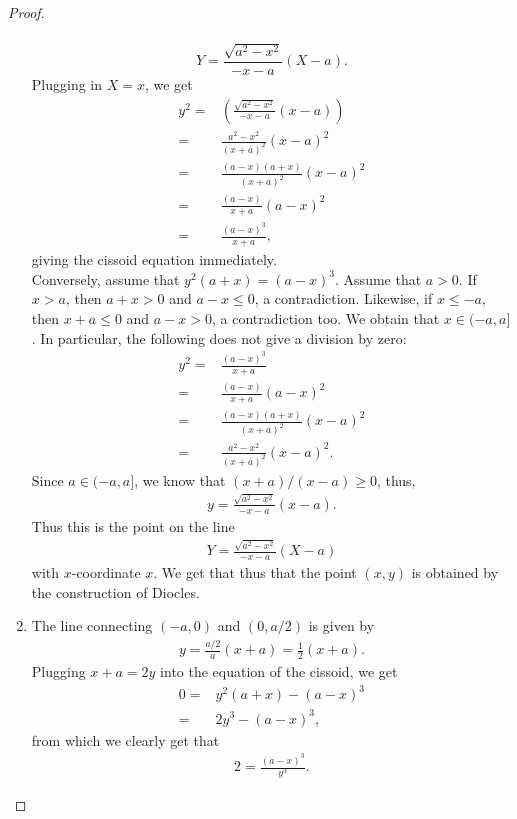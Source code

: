 \begin{proof}
\begin{enumerate}
\begin{align*}
    \end{align*}
    $$Y = \frac{\sqrt{a^2 - x^2}}{-x-a}(X-a).$$
    Plugging in $X = x$, we get
    \begin{align*}
        y^2
        =& \left(\frac{\sqrt{a^2 - x^2}}{-x-a}(x-a)\right)\\
        =& \frac{a^2 - x^2}{(x+a)^2}(x-a)^2\\
        =& \frac{(a-x)(a+x)}{(x+a)^2}(x-a)^2\\
        =& \frac{(a-x)}{x+a}(a-x)^2\\
        =& \frac{(a-x)^3}{x+a},
    \end{align*}
    giving the cissoid equation immediately.\\
    Conversely, assume that $y^2 (a+x) = (a-x)^3$. 
    Assume that $a>0$. 
    If $x>a$, then $a+x>0$ and $a-x\leq 0$, a contradiction. 
    Likewise, if $x\leq -a$, then $x+a\leq 0$ and $a-x>0$, a contradiction too. 
    We obtain that $x\in (-a,a]$. In particular, the following does not give a division by zero:
    \begin{align*}
        y^2
        =& \frac{(a-x)^3}{x+a}\\
        =& \frac{(a-x)}{x+a}(a-x)^2\\
        =& \frac{(a-x)(a+x)}{(x+a)^2}(x-a)^2\\
        =& \frac{a^2 - x^2}{(x+a)^2}(x-a)^2.    
    \end{align*}
    Since $a\in (-a,a]$, we know that $(x+a)/(x-a)\geq 0$, thus,
    \begin{align*}
        y = \frac{\sqrt{a^2 - x^2}}{-x-a}(x-a).
    \end{align*}
    Thus this is the point on the line
    \begin{align*}
        Y = \frac{\sqrt{a^2 - x^2}}{-x-a}(X-a)
    \end{align*}
    with $x$-coordinate $x$. 
    We get that thus that the point $(x,y)$ is obtained by the construction of Diocles.
    \item The line connecting $(-a,0)$ and $(0,a/2)$ is given by
    \begin{align*}
        y = \frac{a/2}{a}(x+a) = \frac{1}{2}(x+a).
    \end{align*}
    Plugging $x+a = 2y$ into the equation of the cissoid, we get
    \begin{align*}
        0
        =& y^2 (a+x) - (a-x)^3\\
        =& 2y^3 - (a-x)^3,
    \end{align*}
    from which we clearly get that
    \begin{align*}
        2 = \frac{(a-x)^3}{y^3}.
    \end{align*}
\end{enumerate}
\end{proof}

